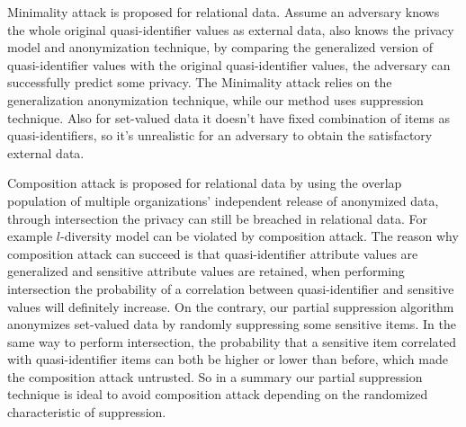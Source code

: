Minimality attack \cite{Wong:2007:Minimality}
is proposed for relational data. Assume an adversary knows the whole original
quasi-identifier values as external data, also knows the privacy model and
anonymization technique, by comparing the generalized version of
quasi-identifier values with the original quasi-identifier values, the
adversary can successfully predict some privacy. The Minimality attack relies
on the generalization anonymization technique, while our method uses
suppression technique. Also for set-valued data it doesn't have fixed
combination of items as quasi-identifiers, so it's unrealistic for an
adversary to obtain the satisfactory external data. 

Composition attack
\cite{Ganta:2008:Composition} is proposed for relational data by using the
overlap population of multiple organizations' independent release of
anonymized data, through intersection the privacy can still be breached in
relational data. For example $l$-diversity \cite{Ganta:2008:Composition}
model can be violated by composition attack. The reason why composition
attack can succeed is that quasi-identifier attribute values are generalized
and sensitive attribute values are retained, when performing intersection the
probability of a correlation between quasi-identifier and sensitive values
will definitely increase. On the contrary, our partial suppression algorithm
anonymizes set-valued data by randomly suppressing some sensitive items. In
the same way to perform intersection,
 the probability that a sensitive item correlated with quasi-identifier items can
both be higher or lower than before, which made the composition attack
untrusted. So in a summary our partial suppression technique is ideal to
avoid composition attack depending on the randomized characteristic of
suppression.


